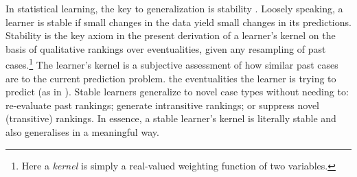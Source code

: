 \documentclass[12pt,a4paper,twoside]{article}
\newcommand{\gsii}{$\textup{GS03}$}
\begin{document}
 In statistical learning, the key to generalization is stability
  \citep{Busquet-Elisseeff-stability-and-generalization,Poggio-stability-and-predictivity}.
  Loosely speaking, a learner is stable if small changes in the data yield
  small changes in its predictions.
  Stability is the key axiom in the present derivation of a learner's kernel on
  the basis of qualitative rankings over eventualities, given any resampling of
  past cases.\footnote{Here a \emph{kernel} is simply a real-valued weighting
  function of two variables.} The learner's kernel is a subjective assessment
  of how similar past cases are to the current prediction problem. the
  eventualities the learner is trying to predict (as in \citet[henceforth
  \gsii]{GS_Inductive_inference}).  Stable learners generalize to novel case
  types without needing to: re-evaluate past rankings; generate intransitive
  rankings; or suppress novel (transitive) rankings.  In essence, a stable
  learner's kernel is literally stable and also generalises in a meaningful
  way.


\end{document}
